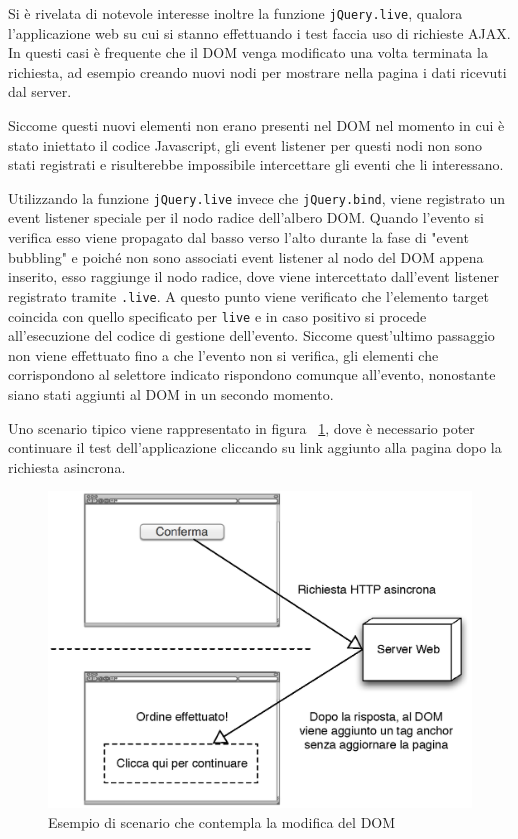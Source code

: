 Si è rivelata di notevole interesse inoltre la funzione \verb|jQuery.live|, qualora l'applicazione web su cui si stanno effettuando i test faccia uso di richieste AJAX. In questi casi è frequente che il DOM venga modificato una volta terminata la richiesta, ad esempio creando nuovi nodi per mostrare nella pagina i dati ricevuti dal server. 

Siccome questi nuovi elementi non erano presenti nel DOM nel momento in cui è stato iniettato il codice Javascript, gli event listener per questi nodi non sono stati registrati e risulterebbe impossibile intercettare gli eventi che li interessano. 

Utilizzando la funzione \verb|jQuery.live| invece che \verb|jQuery.bind|, viene registrato un event listener speciale per il nodo radice dell'albero DOM. Quando l'evento si verifica esso viene propagato dal basso verso l'alto durante la fase di "event bubbling" e poiché non sono associati event listener al nodo del DOM appena inserito, esso raggiunge il nodo radice, dove viene intercettato dall'event listener registrato tramite \verb|.live|. A questo punto viene verificato che l'elemento target coincida con quello specificato per \verb|live| e in caso positivo si procede all'esecuzione del codice di gestione dell'evento. Siccome quest'ultimo passaggio non viene effettuato fino a che l'evento non si verifica, gli elementi che corrispondono al selettore indicato rispondono comunque all'evento, nonostante siano stati aggiunti al DOM in un secondo momento.

Uno scenario tipico viene rappresentato in figura ~\ref{fig:liveEventCase}, dove è necessario poter continuare il test dell'applicazione cliccando su link aggiunto alla pagina dopo la richiesta asincrona.

\begin{figure}[htbp]
\begin{center}
\includegraphics[width=\textwidth]{images/live_event_case.eps}
\caption{Esempio di scenario che contempla la modifica del DOM}
\label{fig:liveEventCase}
\end{center}
\end{figure}

